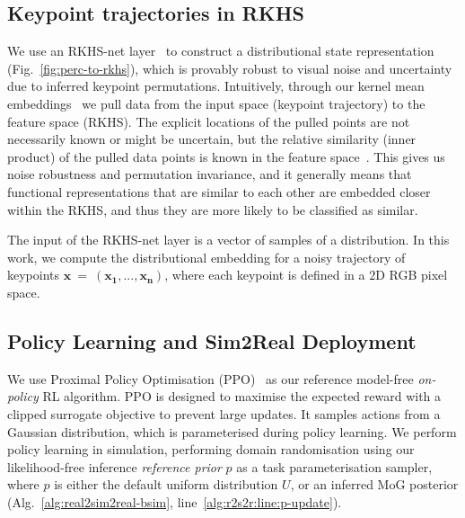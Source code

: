 \subsection{Keypoint trajectories in RKHS}

We use an RKHS-net layer~\cite{antonova2022bayesian} to construct a distributional state representation (Fig.~\ref{fig:perc-to-rkhs}), which is provably robust to visual noise and uncertainty due to inferred keypoint permutations. Intuitively, through our kernel mean embeddings~\cite{muandet2017kernel} we pull data from the input space (keypoint trajectory) to the feature space (RKHS). The explicit locations of the pulled points are not necessarily known or might be uncertain, but the relative similarity (inner product) of the pulled data points is known in the feature space~\cite{ghojogh2021reproducing}. This gives us noise robustness and permutation invariance, and it generally means that functional representations that are similar to each other are embedded closer within the RKHS, and thus they are more likely to be classified as similar.

The input of the RKHS-net layer is a vector of samples of a distribution. In this work, we compute the distributional embedding for a noisy trajectory of keypoints $\mathbf{x}~=~(\mathbf{x_1},...,\mathbf{x_n})$, where each keypoint is defined in a $2$D RGB pixel space. 

\subsection{Policy Learning and Sim2Real Deployment}
\label{subsec:real2sim-param-inference}

We use Proximal Policy Optimisation (PPO)~\cite{schulman2017proximal} as our reference model-free \emph{on-policy} RL algorithm. PPO is designed to maximise the expected reward with a clipped surrogate objective to prevent large updates. It samples actions from a Gaussian distribution, which is parameterised during policy learning.
We perform policy learning in simulation, performing domain randomisation using our likelihood-free inference \emph{reference prior} $p$ as a task parameterisation sampler, where $p$ is either the default uniform distribution $\mathit{U}$, or an inferred MoG posterior (Alg.~\ref{alg:real2sim2real-bsim}, line~\ref{alg:r2s2r:line:p-update}). 

